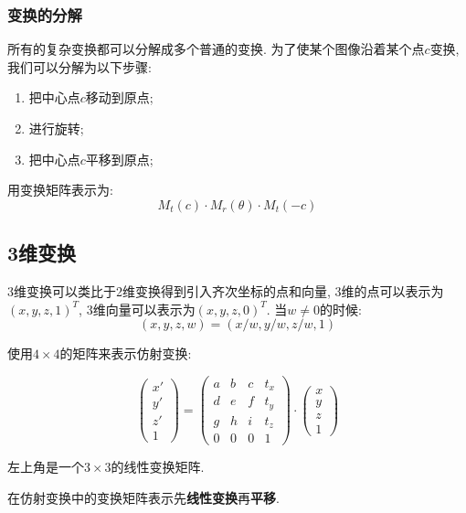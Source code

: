 \documentclass[openany]{progbookcn}
\begin{document}
\subsubsection{变换的分解}

所有的复杂变换都可以分解成多个普通的变换. 为了使某个图像沿着某个点$c$变换, 我们可以分解为以下步骤: 

\begin{enumerate}
	\item 把中心点$c$移动到原点; 
	\item 进行旋转; 
	\item 把中心点$c$平移到原点; 
\end{enumerate}

用变换矩阵表示为: 
\begin{equation}
	M_{t}(c)\cdot M_{r}(\theta) \cdot M_{t}(-c)
\end{equation}

\subsection{3维变换}

3维变换可以类比于2维变换得到引入齐次坐标的点和向量, 3维的点可以表示为$(x,y,z,1)^T$, 3维向量可以表示为$(x,y,z,0)^T$. 当$w\ne 0$的时候: 
\begin{equation}
	(x,y,z,w)=(x/w,y/w,z/w,1)
\end{equation}

使用$4\times 4$的矩阵来表示仿射变换: 

\begin{equation}
	\begin{pmatrix}x'\\y'\\z'\\1\end{pmatrix}=\begin{pmatrix}a&b&c&t_x\\d&e&f&t_y\\g&h&i&t_z\\0&0&0&1\end{pmatrix}\cdot\begin{pmatrix}x\\y\\z\\1\end{pmatrix}
\end{equation}

左上角是一个$3\times 3$的线性变换矩阵. 

在仿射变换中的变换矩阵表示先\textbf{线性变换}再\textbf{平移}. 
\end{document}
